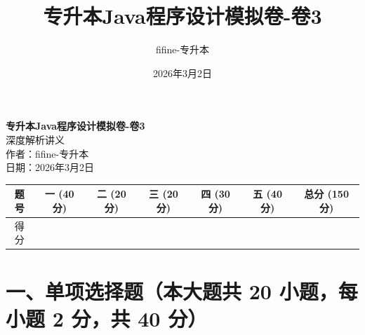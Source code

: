 ﻿\documentclass[12pt, a4paper]{ctexart}
\begin{document}
\title{\textcolor{myblue}{\textbf{专升本Java程序设计模拟卷-卷3}}}
\author{fifine-专升本}
\date{2026年3月2日}


\thispagestyle{empty}
\newpage

\begin{center}
	{\huge\bfseries\color{myblue} 专升本Java程序设计模拟卷-卷3}\\[1em]
	{\large 深度解析讲义}\\[1em]
	{\large 作者：fifine-专升本}\\[1em]
	{\large 日期：2026年3月2日}\\[1em]
	\vspace{1em}
	\begin{tabular}{|c|c|c|c|c|c|c|}
		\hline
		题号 & 一 (40 分)       & 二 (20 分)       & 三 (20 分)       & 四 (30 分)       & 五 (40 分)       & 总分 (150 分)     \\
		\hline
		得分 & \hspace{1.5cm} & \hspace{1.5cm} & \hspace{1.5cm} & \hspace{1.5cm} & \hspace{1.5cm} & \hspace{1.5cm} \\
		\hline
	\end{tabular}
	\vspace{2em}
\end{center}

\section*{一、单项选择题（本大题共 20 小题，每小题 2 分，共 40 分）}
\end{document}
